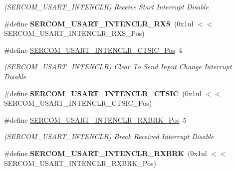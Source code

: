 \begin{DoxyCompactItemize}
\begin{DoxyCompactList}\small\item\em (S\+E\+R\+C\+O\+M\+\_\+\+U\+S\+A\+R\+T\+\_\+\+I\+N\+T\+E\+N\+C\+L\+R) Receive Start Interrupt Disable \end{DoxyCompactList}\item 
\hypertarget{group___s_a_m_l21___s_e_r_c_o_m_ga74d2c1af12decedd2d5efebeac00948f}{}\#define {\bfseries S\+E\+R\+C\+O\+M\+\_\+\+U\+S\+A\+R\+T\+\_\+\+I\+N\+T\+E\+N\+C\+L\+R\+\_\+\+R\+X\+S}~(0x1ul $<$$<$ S\+E\+R\+C\+O\+M\+\_\+\+U\+S\+A\+R\+T\+\_\+\+I\+N\+T\+E\+N\+C\+L\+R\+\_\+\+R\+X\+S\+\_\+\+Pos)\label{group___s_a_m_l21___s_e_r_c_o_m_ga74d2c1af12decedd2d5efebeac00948f}

\item 
\hypertarget{group___s_a_m_l21___s_e_r_c_o_m_ga0751acc62d29f4afba27cf1972efaba6}{}\#define \hyperlink{group___s_a_m_l21___s_e_r_c_o_m_ga0751acc62d29f4afba27cf1972efaba6}{S\+E\+R\+C\+O\+M\+\_\+\+U\+S\+A\+R\+T\+\_\+\+I\+N\+T\+E\+N\+C\+L\+R\+\_\+\+C\+T\+S\+I\+C\+\_\+\+Pos}~4\label{group___s_a_m_l21___s_e_r_c_o_m_ga0751acc62d29f4afba27cf1972efaba6}

\begin{DoxyCompactList}\small\item\em (S\+E\+R\+C\+O\+M\+\_\+\+U\+S\+A\+R\+T\+\_\+\+I\+N\+T\+E\+N\+C\+L\+R) Clear To Send Input Change Interrupt Disable \end{DoxyCompactList}\item 
\hypertarget{group___s_a_m_l21___s_e_r_c_o_m_gaa3bd00b624143ff68630fd01aa7e5500}{}\#define {\bfseries S\+E\+R\+C\+O\+M\+\_\+\+U\+S\+A\+R\+T\+\_\+\+I\+N\+T\+E\+N\+C\+L\+R\+\_\+\+C\+T\+S\+I\+C}~(0x1ul $<$$<$ S\+E\+R\+C\+O\+M\+\_\+\+U\+S\+A\+R\+T\+\_\+\+I\+N\+T\+E\+N\+C\+L\+R\+\_\+\+C\+T\+S\+I\+C\+\_\+\+Pos)\label{group___s_a_m_l21___s_e_r_c_o_m_gaa3bd00b624143ff68630fd01aa7e5500}

\item 
\hypertarget{group___s_a_m_l21___s_e_r_c_o_m_ga9f4ed3c5eb917a97501f586ae5170e27}{}\#define \hyperlink{group___s_a_m_l21___s_e_r_c_o_m_ga9f4ed3c5eb917a97501f586ae5170e27}{S\+E\+R\+C\+O\+M\+\_\+\+U\+S\+A\+R\+T\+\_\+\+I\+N\+T\+E\+N\+C\+L\+R\+\_\+\+R\+X\+B\+R\+K\+\_\+\+Pos}~5\label{group___s_a_m_l21___s_e_r_c_o_m_ga9f4ed3c5eb917a97501f586ae5170e27}

\begin{DoxyCompactList}\small\item\em (S\+E\+R\+C\+O\+M\+\_\+\+U\+S\+A\+R\+T\+\_\+\+I\+N\+T\+E\+N\+C\+L\+R) Break Received Interrupt Disable \end{DoxyCompactList}\item 
\hypertarget{group___s_a_m_l21___s_e_r_c_o_m_ga4025eb0f6591ca8b2709996c63aae3dd}{}\#define {\bfseries S\+E\+R\+C\+O\+M\+\_\+\+U\+S\+A\+R\+T\+\_\+\+I\+N\+T\+E\+N\+C\+L\+R\+\_\+\+R\+X\+B\+R\+K}~(0x1ul $<$$<$ S\+E\+R\+C\+O\+M\+\_\+\+U\+S\+A\+R\+T\+\_\+\+I\+N\+T\+E\+N\+C\+L\+R\+\_\+\+R\+X\+B\+R\+K\+\_\+\+Pos)\label{group___s_a_m_l21___s_e_r_c_o_m_ga4025eb0f6591ca8b2709996c63aae3dd}


\end{DoxyCompactItemize}
